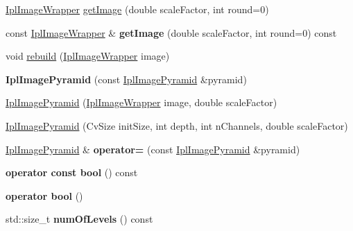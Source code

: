 \begin{DoxyCompactItemize}
\item 
\hyperlink{class_ipl_image_wrapper}{IplImageWrapper} \hyperlink{class_ipl_image_pyramid_a73af0a82dfdca6eaa25a75b3c73996a3}{getImage} (double scaleFactor, int round=0)
\item 
\hypertarget{class_ipl_image_pyramid_a639bc15e51e6a7b55194eb800915cd52}{
const \hyperlink{class_ipl_image_wrapper}{IplImageWrapper} \& {\bfseries getImage} (double scaleFactor, int round=0) const }
\label{class_ipl_image_pyramid_a639bc15e51e6a7b55194eb800915cd52}

\item 
void \hyperlink{class_ipl_image_pyramid_a24f697b2da922a8240aa9f24af476d5e}{rebuild} (\hyperlink{class_ipl_image_wrapper}{IplImageWrapper} image)
\item 
\hypertarget{class_ipl_image_pyramid_a14dd8c56c07c98f7714dcb5e76aaeb72}{
{\bfseries IplImagePyramid} (const \hyperlink{class_ipl_image_pyramid}{IplImagePyramid} \&pyramid)}
\label{class_ipl_image_pyramid_a14dd8c56c07c98f7714dcb5e76aaeb72}

\item 
\hyperlink{class_ipl_image_pyramid_a6d41d348cdfaea6e4444b1fdd523f555}{IplImagePyramid} (\hyperlink{class_ipl_image_wrapper}{IplImageWrapper} image, double scaleFactor)
\item 
\hyperlink{class_ipl_image_pyramid_a817d4a60ac96b844a97df0fa1bc52a5e}{IplImagePyramid} (CvSize initSize, int depth, int nChannels, double scaleFactor)
\item 
\hypertarget{class_ipl_image_pyramid_a526cc2971a83597e995e2e173de0e8dc}{
\hyperlink{class_ipl_image_pyramid}{IplImagePyramid} \& {\bfseries operator=} (const \hyperlink{class_ipl_image_pyramid}{IplImagePyramid} \&pyramid)}
\label{class_ipl_image_pyramid_a526cc2971a83597e995e2e173de0e8dc}

\item 
\hypertarget{class_ipl_image_pyramid_a3208ef615be469259755968496df11ea}{
{\bfseries operator const bool} () const }
\label{class_ipl_image_pyramid_a3208ef615be469259755968496df11ea}

\item 
\hypertarget{class_ipl_image_pyramid_a9759305c20611d150f35fed4df4b804e}{
{\bfseries operator bool} ()}
\label{class_ipl_image_pyramid_a9759305c20611d150f35fed4df4b804e}

\item 
\hypertarget{class_ipl_image_pyramid_aed09f40471c9cf123c9d5dfe7f0d6bd1}{
std::size\_\-t {\bfseries numOfLevels} () const }
\label{class_ipl_image_pyramid_aed09f40471c9cf123c9d5dfe7f0d6bd1}


\end{DoxyCompactItemize}
